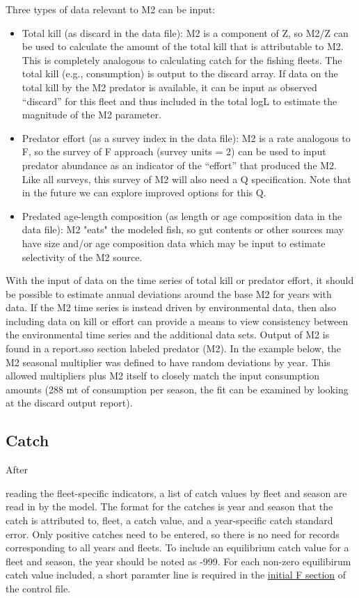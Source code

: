Three types of data relevant to M2 can be input:

\begin{itemize}
	\item Total kill (as discard in the data file): M2 is a component of Z, so M2/Z can be used to calculate the amount of the total kill that is attributable to M2. This is completely analogous to calculating catch for the fishing fleets. The total kill (e.g., consumption) is output to the discard array. If data on the total kill by the M2 predator is available, it can be input as observed ``discard'' for this fleet and thus included in the total logL to estimate the magnitude of the M2 parameter.
	
	\item Predator effort (as a survey index in the data file): M2 is a rate analogous to F, so the survey of F approach (survey units = 2) can be used to input predator abundance as an indicator of the ``effort'' that produced the M2. Like all surveys, this survey of M2 will also need a Q specification. Note that in the future we can explore improved options for this Q.
	
	\item Predated age-length composition (as length or age composition data in the data file): M2 "eats" the modeled fish, so gut contents or other sources may have size and/or age composition data which may be input to estimate selectivity of the M2 source. 
\end{itemize}

With the input of data on the time series of total kill or predator effort, it should be possible to estimate annual deviations around the base M2 for years with data. If the M2 time series is instead driven by environmental data, then also including data on kill or effort can provide a means to view consistency between the environmental time series and the additional data sets. Output of M2 is found in a report.sso section labeled predator (M2). In the example below, the M2 seasonal multiplier was defined to have random deviations by year. This allowed multipliers plus M2 itself to closely match the input consumption amounts (288 mt of consumption per season, the fit can be examined by looking at the discard output report).


\subsection{Catch}
\hypertarget{CatchFormat}{After} reading the fleet-specific indicators, a list of catch values by fleet and season are read in by the model. The format for the catches is year and season that the catch is attributed to, fleet, a catch value, and a year-specific catch standard error. Only positive catches need to be entered, so there is no need for records corresponding to all years and fleets. To include an equilibrium catch value for a fleet and season, the year should be noted as -999. For each non-zero equilibirum catch value included, a short paramter line is required in the \hyperlink{InitF}{initial F section} of the control file.

